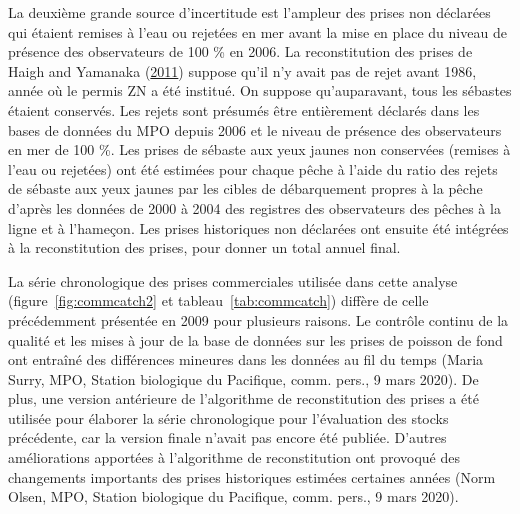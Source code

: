 \documentclass[11pt]{book}
\begin{document}
La deuxième grande source d'incertitude est l'ampleur des prises non déclarées qui étaient remises à l'eau ou rejetées en mer avant la mise en place du niveau de présence des observateurs de 100 \% en 2006. La reconstitution des prises de Haigh and Yamanaka (\protect\hyperlink{ref-haigh2011}{2011}) suppose qu'il n'y avait pas de rejet avant 1986, année où le permis ZN a été institué. On suppose qu'auparavant, tous les sébastes étaient conservés. Les rejets sont présumés être entièrement déclarés dans les bases de données du MPO depuis 2006 et le niveau de présence des observateurs en mer de 100 \%. Les prises de sébaste aux yeux jaunes non conservées (remises à l'eau ou rejetées) ont été estimées pour chaque pêche à l'aide du ratio des rejets de sébaste aux yeux jaunes par les cibles de débarquement propres à la pêche d'après les données de 2000 à 2004 des registres des observateurs des pêches à la ligne et à l'hameçon. Les prises historiques non déclarées ont ensuite été intégrées à la reconstitution des prises, pour donner un total annuel final.

La série chronologique des prises commerciales utilisée dans cette analyse (figure~\ref{fig:commcatch2} et tableau~\ref{tab:commcatch}) diffère de celle précédemment présentée en 2009 pour plusieurs raisons. Le contrôle continu de la qualité et les mises à jour de la base de données sur les prises de poisson de fond ont entraîné des différences mineures dans les données au fil du temps (Maria Surry, MPO, Station biologique du Pacifique, comm. pers., 9 mars 2020). De plus, une version antérieure de l'algorithme de reconstitution des prises a été utilisée pour élaborer la série chronologique pour l'évaluation des stocks précédente, car la version finale n'avait pas encore été publiée. D'autres améliorations apportées à l'algorithme de reconstitution ont provoqué des changements importants des prises historiques estimées certaines années (Norm Olsen, MPO, Station biologique du Pacifique, comm. pers., 9 mars 2020).
\end{document}
